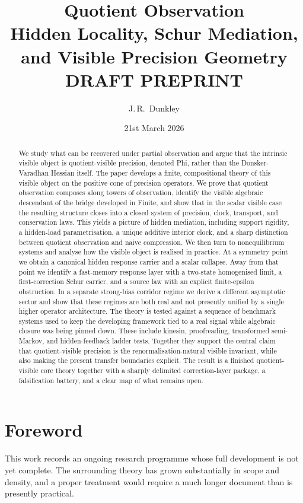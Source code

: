 \documentclass[11pt]{article}
\title{\textbf{Quotient Observation}\\[0.2em]
{\large Hidden Locality, Schur Mediation, and Visible Precision Geometry}\\[0.2em]
{\large \textbf{DRAFT PREPRINT}}}
\author{J.\,R.~Dunkley}
\date{21st March 2026}
\numberwithin{equation}{section}
\theoremstyle{thmcompact}
\theoremstyle{remark}
\begin{document}
\maketitle

\begin{abstract}
We study what can be recovered under partial observation and argue that the intrinsic visible object is quotient-visible precision, denoted Phi, rather than the Donsker-Varadhan Hessian itself. The paper develops a finite, compositional theory of this visible object on the positive cone of precision operators. We prove that quotient observation composes along towers of observation, identify the visible algebraic descendant of the bridge developed in Finite, and show that in the scalar visible case the resulting structure closes into a closed system of precision, clock, transport, and conservation laws. This yields a picture of hidden mediation, including support rigidity, a hidden-load parametrisation, a unique additive interior clock, and a sharp distinction between quotient observation and naive compression. We then turn to nonequilibrium systems and analyse how the visible object is realised in practice. At a symmetry point we obtain a canonical hidden response carrier and a scalar collapse. Away from that point we identify a fast-memory response layer with a two-state homogenised limit, a first-correction Schur carrier, and a source law with an explicit finite-epsilon obstruction. In a separate strong-bias corridor regime we derive a different asymptotic sector and show that these regimes are both real and not presently unified by a single higher operator architecture. The theory is tested against a sequence of benchmark systems used to keep the developing framework tied to a real signal while algebraic closure was being pinned down. These include kinesin, proofreading, transformed semi-Markov, and hidden-feedback ladder tests. Together they support the central claim that quotient-visible precision is the renormalisation-natural visible invariant, while also making the present transfer boundaries explicit. The result is a finished quotient-visible core theory together with a sharply delimited correction-layer package, a falsification battery, and a clear map of what remains open.
\end{abstract}

\newpage

\tableofcontents

\newpage

\section*{Foreword}
This work records an ongoing research programme whose full development is not yet complete. The surrounding theory has grown substantially in scope and density, and a proper treatment would require a much longer document than is presently practical.
\end{document}
